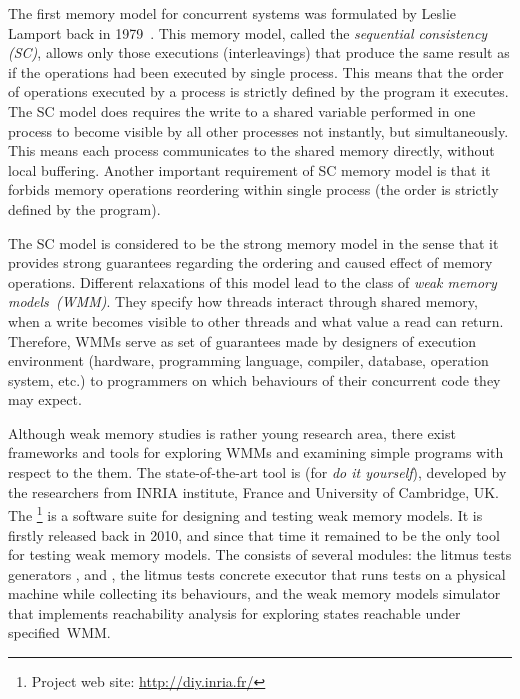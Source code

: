 
The first memory model for concurrent systems was formulated by Leslie Lamport back in 1979~\cite{lamport1979make}. This memory model, called the \textit{sequential consistency (SC)}, allows only those executions (interleavings) that produce the same result as if the operations had been executed by single process. This means that the order of operations executed by a process is strictly defined by the program it executes. The SC model does requires the write to a shared variable performed in one process to become visible by all other processes not instantly, but simultaneously. This means each process communicates to the shared memory directly, without local buffering. Another important requirement of SC memory model is that it forbids memory operations reordering within single process (the order is strictly defined by the program).

The SC model is considered to be the strong memory model in the sense that it provides strong guarantees regarding the ordering and caused effect of memory operations. Different relaxations of this model lead to the class of \textit{weak memory models~(WMM)}.
They specify how threads interact through shared memory, when a write becomes visible to other threads and what value a read can return. 
Therefore, WMMs serve as set of guarantees made by designers of execution environment (hardware, programming language, compiler, database, operation system, etc.) to programmers on which behaviours of their concurrent code they may expect. 

Although weak memory studies is rather young research area, there exist frameworks and tools for exploring WMMs and examining simple programs with respect to the them. The state-of-the-art tool is  (for \textit{do it yourself}), developed by the researchers from INRIA institute, France and University of Cambridge, UK.
The \footnote{Project web site: \url{http://diy.inria.fr/}} is a software suite for designing and testing weak memory models. It is firstly released back in 2010, and since that time it remained to be the only tool for testing weak memory models. The  consists of several modules: the litmus tests generators ,  and , the litmus tests concrete executor  that runs tests on a physical machine while collecting its behaviours, and the weak memory models simulator  that implements reachability analysis for exploring states reachable under specified~WMM.

